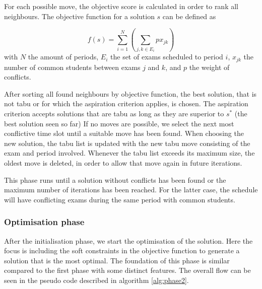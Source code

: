 For each possible move, the objective score is calculated in order to rank all neighbours. The objective function for a solution $s$ can be defined as

\begin{equation}
    f(s) = \sum_{i=1}^{N} ( \sum_{j,k \in E_i}^{}p x_{jk})
\end{equation}
with $N$ the amount of periods, $E_i$ the set of exams scheduled to period $i$, $x_{jk}$ the number of common students between exams $j$ and $k$,
and $p$ the weight of conflicts.

After sorting all found neighbours by objective function, the best solution, that is not tabu or for which the aspiration criterion applies, is chosen. The aspiration criterion accepts solutions that are tabu as long as they are superior to $s^*$ (the best solution seen so far) If no moves are possible, we select the next most conflictive time slot until a suitable move has been found. When choosing the new solution, the tabu list is updated with the new tabu move consisting of the exam and period involved. Whenever the tabu list exceeds its maximum size, the oldest move is deleted, in order to allow that move again in future iterations.

This phase runs until a solution without conflicts has been found or the maximum number of iterations has been reached. For the latter case, the schedule will have conflicting exams during the same period with common students.

\subsubsection{Optimisation phase}

After the initialisation phase, we start the optimisation of the solution. Here the focus is including the soft constraints in the objective function to generate a solution that is the most optimal. The foundation of this phase is similar compared to the first phase with some distinct features. The overall flow can be seen in the pseudo code described in algorithm \ref{alg:phase2}.

